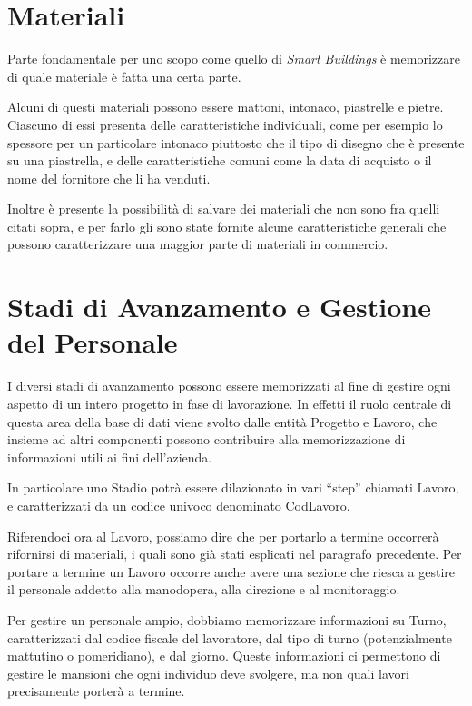 \documentclass[12pt,a4paper]{report}
\begin{document}
        \section{Materiali}
            Parte fondamentale per uno scopo come quello di \emph{Smart Buildings} è memorizzare di quale materiale è fatta una certa parte.

            Alcuni di questi materiali possono essere mattoni, intonaco, piastrelle e pietre. Ciascuno di essi presenta delle caratteristiche individuali, come per esempio lo spessore per un particolare intonaco piuttosto che il tipo di disegno che è presente su una piastrella, e delle caratteristiche comuni come la data di acquisto o il nome del fornitore che li ha venduti.

            Inoltre è presente la possibilità di salvare dei materiali che non sono fra quelli citati sopra, e per farlo gli sono state fornite alcune caratteristiche generali che possono caratterizzare una maggior parte di  materiali in commercio.
        \section{Stadi di Avanzamento e Gestione del Personale}
            I diversi stadi di avanzamento possono essere memorizzati al fine di gestire ogni aspetto di un intero progetto in fase di lavorazione. In effetti il ruolo centrale di questa area della base di dati viene svolto dalle entità Progetto e Lavoro, che insieme ad altri componenti possono contribuire alla memorizzazione di informazioni utili ai fini dell'azienda.
            
            In particolare uno Stadio potrà essere dilazionato in vari ``step'' chiamati Lavoro, e caratterizzati da un codice univoco denominato CodLavoro.

            Riferendoci ora al Lavoro, possiamo dire che per portarlo a termine occorrerà rifornirsi di materiali, i quali sono già stati esplicati nel paragrafo precedente. Per portare a termine un Lavoro occorre anche avere una sezione che riesca a gestire il personale addetto alla manodopera, alla direzione e al monitoraggio.

            Per gestire un personale ampio, dobbiamo memorizzare informazioni su Turno, caratterizzati dal codice fiscale del lavoratore, dal tipo di turno (potenzialmente mattutino o pomeridiano), e dal giorno. Queste informazioni ci permettono di gestire le mansioni che ogni individuo deve svolgere, ma non quali lavori precisamente porterà a termine.
\end{document}
